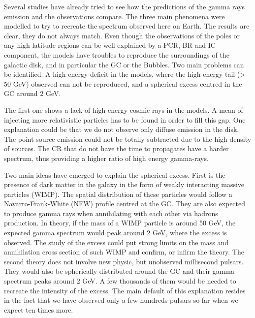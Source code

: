 Several studies have already tried to see how the predictions of the gamma rays emission and the observations compare. The three main phenomena were modelled to try to recreate the spectrum observed here on Earth. The results are clear, they do not always match.
Even though the observations of the poles or any high latitude regions can be well explained by a PCR, BR and IC component, the models have troubles to reproduce the surroundings of the galactic disk, and in particular the GC or the Bubbles. 
Two main problems can be identified. A high energy deficit in the models, where the high energy tail (> 50 GeV) observed can not be reproduced, and a spherical excess centred in the GC around 2 GeV.

The first one shows a lack of high energy cosmic-rays in the models. A mean of injecting more relativistic particles has to be found in order to fill this gap. One explanation could be that we do not observe only diffuse emission in the disk. The point source emission could not be totally subtracted due to the high density of sources. The CR that do not have the time to propagates have a harder spectrum, thus providing a higher ratio of high energy gamma-rays.

Two main ideas have emerged to explain the spherical excess.
First is the presence of dark matter in the galaxy in the form of weakly interacting massive particles (WIMP). The spatial distribution of these particles would follow a Navarro-Frank-White (NFW) profile centred at the GC. They are also expected to produce gamma rays when annihilating with each other via hadrons production. In theory, if the mass of a WIMP particle is around 50 GeV, the expected gamma spectrum would peak around 2 GeV, where the excess is observed. 
The study of the excess could put strong limits on the mass and annihilation cross section of such WIMP and confirm, or infirm the theory.
The second theory does not involve new physic, but unobserved millisecond pulsars. They would also be spherically distributed around the GC and their gamma spectrum peaks around 2 GeV. A few thousands of them would be needed to recreate the intensity of the excess. The main default of this explanation resides in the fact that we have observed only a few hundreds pulsars so far when we expect ten times more.







































